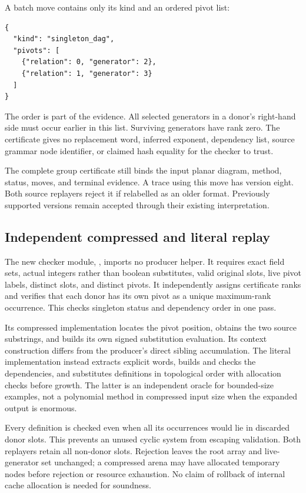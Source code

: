 A batch move contains only its kind and an ordered pivot list:
\begin{lstlisting}
{
  "kind": "singleton_dag",
  "pivots": [
    {"relation": 0, "generator": 2},
    {"relation": 1, "generator": 3}
  ]
}
\end{lstlisting}
The order is part of the evidence. All selected generators in a donor's
right-hand side must occur earlier in this list. Surviving generators have
rank zero. The certificate gives no replacement word, inferred exponent,
dependency list, source grammar node identifier, or claimed hash equality
for the checker to trust.

The complete group certificate still binds the input planar diagram,
method, status, moves, and terminal evidence. A trace using this move has
version eight. Both source replayers reject it if relabelled as an older
format. Previously supported versions remain accepted through their
existing interpretation.

\subsection{Independent compressed and literal replay}

The new checker module, , imports no producer
helper. It requires exact field sets, actual integers rather than boolean
substitutes, valid original slots, live pivot labels, distinct slots, and
distinct pivots. It independently assigns certificate ranks and verifies
that each donor has its own pivot as a unique maximum-rank occurrence.
This checks singleton status and dependency order in one pass.

Its compressed implementation locates the pivot position, obtains the two
source substrings, and builds its own signed substitution evaluation.
Its context construction differs from the producer's direct sibling
accumulation. The literal implementation instead extracts explicit words,
builds and checks the dependencies, and substitutes definitions in
topological order with allocation checks before growth. The latter is an
independent oracle for bounded-size examples, not a polynomial method in
compressed input size when the expanded output is enormous.

Every definition is checked even when all its occurrences would lie in
discarded donor slots. This prevents an unused cyclic system from escaping
validation. Both replayers retain all non-donor slots. Rejection leaves
the root array and live-generator set unchanged; a compressed arena may
have allocated temporary nodes before rejection or resource exhaustion.
No claim of rollback of internal cache allocation is needed for soundness.

